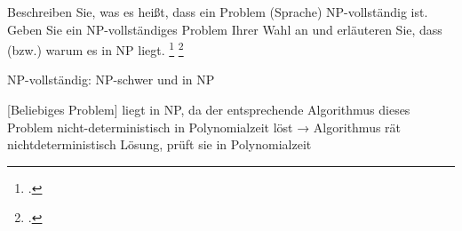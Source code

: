 \documentclass{bschlangaul-aufgabe}
\begin{document}

Beschreiben Sie, was es heißt, dass ein Problem (Sprache) NP-vollständig
ist. Geben Sie ein NP-vollständiges Problem Ihrer Wahl an und erläuteren
Sie, dass (bzw.) warum es in NP liegt.
\footcite{examen:46115:2016:03}
\footcite[Seite 15, Aufgabe 11]{theo:ab:4}

\begin{bAntwort}
NP-vollständig: NP-schwer und in NP

[Beliebiges Problem] liegt in NP, da der entsprechende Algorithmus
dieses Problem nicht-deterministisch in Polynomialzeit löst → Algorithmus rät
nichtdeterministisch Lösung, prüft sie in Polynomialzeit
\end{bAntwort}
\end{document}
